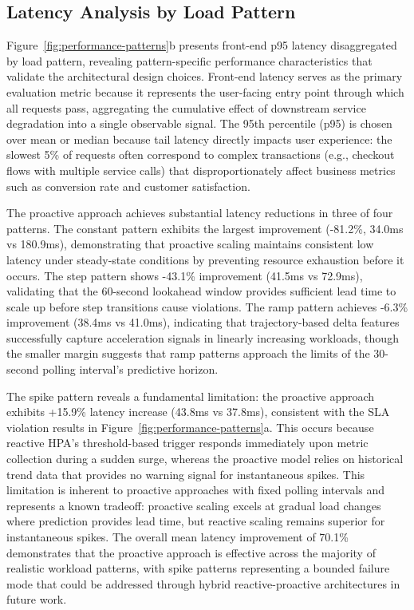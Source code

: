 \documentclass[conference]{IEEEtran}
\begin{document}
\subsection{Latency Analysis by Load Pattern}

Figure~\ref{fig:performance-patterns}b presents front-end p95 latency disaggregated by load pattern, revealing pattern-specific performance characteristics that validate the architectural design choices. Front-end latency serves as the primary evaluation metric because it represents the user-facing entry point through which all requests pass, aggregating the cumulative effect of downstream service degradation into a single observable signal. The 95th percentile (p95) is chosen over mean or median because tail latency directly impacts user experience: the slowest 5\% of requests often correspond to complex transactions (e.g., checkout flows with multiple service calls) that disproportionately affect business metrics such as conversion rate and customer satisfaction.

The proactive approach achieves substantial latency reductions in three of four patterns. The constant pattern exhibits the largest improvement (-81.2\%, 34.0ms vs 180.9ms), demonstrating that proactive scaling maintains consistent low latency under steady-state conditions by preventing resource exhaustion before it occurs. The step pattern shows -43.1\% improvement (41.5ms vs 72.9ms), validating that the 60-second lookahead window provides sufficient lead time to scale up before step transitions cause violations. The ramp pattern achieves -6.3\% improvement (38.4ms vs 41.0ms), indicating that trajectory-based delta features successfully capture acceleration signals in linearly increasing workloads, though the smaller margin suggests that ramp patterns approach the limits of the 30-second polling interval's predictive horizon.

The spike pattern reveals a fundamental limitation: the proactive approach exhibits +15.9\% latency increase (43.8ms vs 37.8ms), consistent with the SLA violation results in Figure~\ref{fig:performance-patterns}a. This occurs because reactive HPA's threshold-based trigger responds immediately upon metric collection during a sudden surge, whereas the proactive model relies on historical trend data that provides no warning signal for instantaneous spikes. This limitation is inherent to proactive approaches with fixed polling intervals and represents a known tradeoff: proactive scaling excels at gradual load changes where prediction provides lead time, but reactive scaling remains superior for instantaneous spikes. The overall mean latency improvement of 70.1\% demonstrates that the proactive approach is effective across the majority of realistic workload patterns, with spike patterns representing a bounded failure mode that could be addressed through hybrid reactive-proactive architectures in future work.
\end{document}
